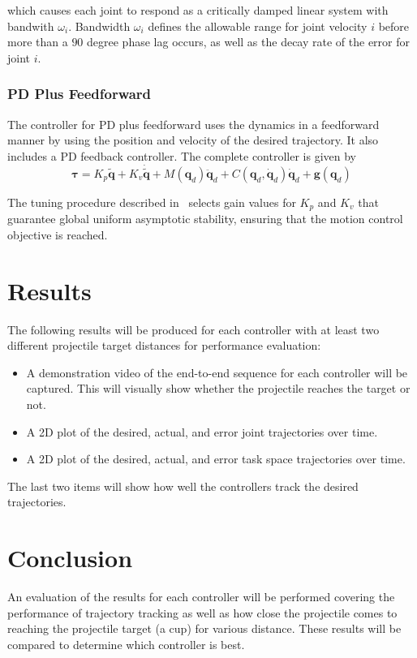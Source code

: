 \documentclass[conference]{IEEEtran}
\begin{document}
which causes each joint to respond as a critically damped linear system with
bandwith $\omega_i$. Bandwidth $\omega_i$ defines the allowable range for joint
velocity $i$ before more than a $90$ degree phase lag occurs, as well as the
decay rate of the error for joint $i$.

\subsubsection{PD Plus Feedforward}
The controller for PD plus feedforward uses the dynamics in a feedforward manner
by using the position and velocity of the desired trajectory. It also includes a
PD feedback controller. The complete controller is given by
\begin{equation*}
  \boldsymbol{\tau} = K_p \tilde{\boldsymbol{q}} + K_v \dot{\tilde{\boldsymbol{q}}} + M(\boldsymbol{q}_d)\ddot{\boldsymbol{q}}_d +  C(\boldsymbol{q}_d, \dot{\boldsymbol{q}}_d)\dot{\boldsymbol{q}}_d + \boldsymbol{g}(\boldsymbol{q}_d)
\end{equation*}

The tuning procedure described in~\cite{kelly2007control} selects gain values for $K_p$
and $K_v$ that guarantee global uniform asymptotic stability, ensuring that the
motion control objective is reached.

\section{Results}

The following results will be produced for each controller with at least two
different projectile target distances for performance evaluation:

\begin{itemize}
\item A demonstration video of the end-to-end sequence for each controller will
  be captured. This will visually show whether the projectile reaches the target or not.
\item A 2D plot of the desired, actual, and error joint trajectories over time.
\item A 2D plot of the desired, actual, and error task space trajectories over time.
\end{itemize}

The last two items will show how well the controllers track the desired trajectories.

\section{Conclusion}
An evaluation of the results for each controller will be performed covering the
performance of trajectory tracking as well as how close the projectile comes to
reaching the projectile target (a cup) for various distance. These results will
be compared to determine which controller is best.



\end{document}

